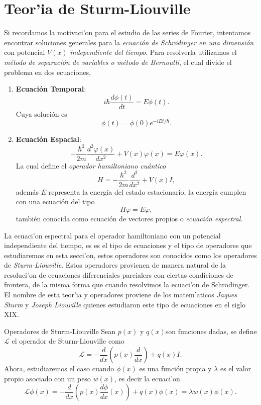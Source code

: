 \documentclass[main.tex]{subfiles}
\begin{document}
\chapter{Teor'ia de Sturm-Liouville}
\noindent Si recordamos la motivaci'on para el estudio de las series de Fourier, intentamos encontrar soluciones generales para la \emph{ecuación de Schrödinger en una dimensión} con potencial \(V(x)\) \emph{independiente del tiempo}. Para resolverla utilizamos el \emph{método de separación de variables o método de Bernoulli}, el cual divide el problema en dos ecuaciones,

\begin{enumerate}
    \item \textbf{Ecuación Temporal}:
    \[
    i\hbar \dfrac{d \phi(t)}{dt} = E \phi(t).
    \]
    Cuya solución es
    \[
    \phi(t) = \phi(0) e^{-iEt/\hbar}.
    \]

    \item \textbf{Ecuación Espacial}:
    \[
    -\frac{\hbar^2}{2m} \dfrac{d^2 \varphi(x)}{dx^2} + V(x) \varphi(x) = E \varphi(x).
    \]
    La cual define el \emph{operador hamiltoniano cuántico}
    \[
    H =-\frac{\hbar^2}{2m} \dfrac{d^2 }{dx^2} + V(x)I,
    \]
    además \(E\) representa la energía del estado estacionario, la energía cumplen con una ecuación del tipo
    \[
    H\varphi=E\varphi,
    \]
    también conocida como ecuación de vectores propios o \emph{ecuación espectral}.
\end{enumerate}
La ecuaci'on  espectral para el operador hamiltoniano con un potencial independiente del tiempo, es es el tipo de ecuaciones y el tipo de operadores que estudiaremos en esta secci'on, estos operadores son conocidos como los operadores de \emph{Sturm-Liouville}. Estos operadores provienen de manera natural de la resoluci'on de ecuaciones diferenciales parcialers con ciertas condiciones de frontera, de la misma forma que cuando resolvimos la ecuaci'on de Schrödinger. El nombre de esta teor'ia y operadores proviene de los matem'aticos \emph{Jaques Sturm} y \emph{Joseph Liouville} quienes estudiaron este tipo de ecuaciones en el siglo XIX.

\begin{def.}{Operadores de Sturm-Liouville}
  Sean \(p(x)\) y \(q(x)\)son funciones dadas, se define \(\mathcal{L}\) el operador de Sturm-Liouville como
  \[
    \mathcal{L}= -\frac{d}{dx} \left( p(x) \dfrac{d}{dx} \right) + q(x)I.
  \]
  Ahora, estudiaremos el caso cuando \(\phi(x)\) es una función propia y \(\lambda\) es el valor propio asociado con un peso \(w(x)\), es decir la ecuaci'on
  \[
    \mathcal{L}\phi(x)= -\frac{d}{dx}\left( p(x) \dfrac{d\phi}{dx}(x)\right) + q(x)\phi(x)=\lambda w(x)\phi(x).
  \]
\end{def.}
\end{document}
